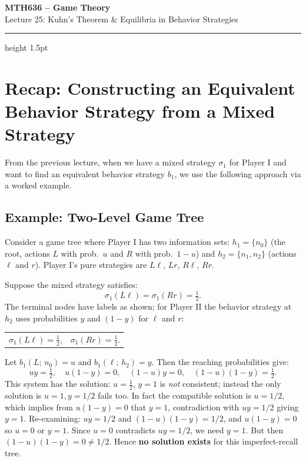 \documentclass[12pt, a4paper]{article}
\begin{document}
\begin{center}
  {\LARGE\bfseries\sffamily\color{defblue} MTH636 -- Game Theory}\\[6pt]
  {\Large\sffamily Lecture 25: Kuhn's Theorem \& Equilibria in Behavior Strategies}\\[4pt]
\end{center}
\vspace{0.5cm}
\hrule height 1.5pt
\vspace{0.3cm}

\section{Recap: Constructing an Equivalent Behavior Strategy from a Mixed Strategy}

From the previous lecture, when we have a mixed strategy $\sigma_1$ for Player I and want to find an equivalent behavior strategy $b_1$, we use the following approach via a worked example.

\subsection{Example: Two-Level Game Tree}

Consider a game tree where Player I has two information sets: $h_1 = \{n_0\}$ (the root, actions $L$ with prob.\ $u$ and $R$ with prob.\ $1-u$) and $h_2 = \{n_1, n_2\}$ (actions $\ell$ and $r$). Player I's pure strategies are $L\ell$, $Lr$, $R\ell$, $Rr$.

Suppose the mixed strategy satisfies:
\[
  \sigma_1(L\ell) = \sigma_1(Rr) = \tfrac{1}{2}.
\]
The terminal nodes have labels as shown; for Player II the behavior strategy at $h_2$ uses probabilities $y$ and $(1-y)$ for $\ell$ and $r$:

\begin{center}
  \begin{tabular}{ll}
    $\sigma_1(L\ell) = \tfrac{1}{2}$, & $\sigma_1(Rr) = \tfrac{1}{2}$.
  \end{tabular}
\end{center}

Let $b_1(L;\, n_0) = u$ and $b_1(\ell;\, h_2) = y$. Then the reaching probabilities give:
\[
  uy = \tfrac{1}{2}, \quad u(1-y) = 0, \quad (1-u)y = 0, \quad (1-u)(1-y) = \tfrac{1}{2}.
\]
This system has the solution: $u = \tfrac{1}{2}$, $y = 1$ is \emph{not} consistent; instead the only solution is $u=1, y=1/2$ fails too. In fact the compatible solution is $u = 1/2$, which implies from $u(1-y)=0$ that $y=1$, contradiction with $uy=1/2$ giving $y=1$. Re-examining: $uy = 1/2$ and $(1-u)(1-y) = 1/2$, and $u(1-y)=0$ so $u=0$ or $y=1$. Since $u=0$ contradicts $uy=1/2$, we need $y=1$. But then $(1-u)(1-y)=0\neq 1/2$. Hence \textbf{no solution exists} for this imperfect-recall tree.
\end{document}
